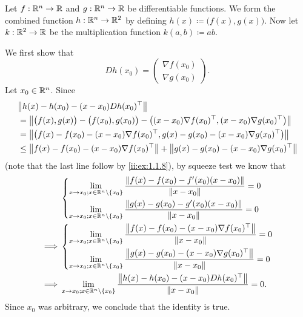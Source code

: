 \begin{eg}\label{ii:6.4.2}
  Let \(f : \R^n \to \R\) and \(g : \R^n \to \R\) be differentiable functions.
  We form the combined function \(h : \R^n \to \R^2\) by defining \(h(x) \coloneqq \big(f(x), g(x)\big)\).
  Now let \(k : \R^2 \to \R\) be the multiplication function \(k(a, b) \coloneqq ab\).

  We first show that
  \[
    D h(x_0) = \begin{pmatrix}
      \nabla f(x_0) \\
      \nabla g(x_0)
    \end{pmatrix}.
  \]
  Let \(x_0 \in \R^n\).
  Since
  \begin{align*}
     & \norm*{h(x) - h(x_0) - (x - x_0) D h(x_0)^\top}                                                                                  \\
     & = \norm*{\big(f(x), g(x)\big) - \big(f(x_0), g(x_0)\big) - \big((x - x_0) \nabla f(x_0)^\top, (x - x_0) \nabla g(x_0)^\top\big)} \\
     & = \norm*{\big(f(x) - f(x_0) - (x - x_0) \nabla f(x_0)^\top, g(x) - g(x_0) - (x - x_0) \nabla g(x_0)^\top\big)}                   \\
     & \leq \norm*{f(x) - f(x_0) - (x - x_0) \nabla f(x_0)^\top} + \norm*{g(x) - g(x_0) - (x - x_0) \nabla g(x_0)^\top}
  \end{align*}
  (note that the last line follow by \cref{ii:ex:1.1.8}),
  by squeeze test we know that
  \begin{align*}
             & \begin{dcases}
                 \lim_{x \to x_0 ; x \in \R^n \setminus \set{x_0}} \dfrac{\norm*{f(x) - f(x_0) - f'(x_0)(x - x_0)}}{\norm*{x - x_0}} = 0 \\
                 \lim_{x \to x_0 ; x \in \R^n \setminus \set{x_0}} \dfrac{\norm*{g(x) - g(x_0) - g'(x_0)(x - x_0)}}{\norm*{x - x_0}} = 0
               \end{dcases}       \\
    \implies & \begin{dcases}
                 \lim_{x \to x_0 ; x \in \R^n \setminus \set{x_0}} \dfrac{\norm*{f(x) - f(x_0) - (x - x_0) \nabla f(x_0)^\top}}{\norm*{x - x_0}} = 0 \\
                 \lim_{x \to x_0 ; x \in \R^n \setminus \set{x_0}} \dfrac{\norm*{g(x) - g(x_0) - (x - x_0) \nabla g(x_0)^\top}}{\norm*{x - x_0}} = 0
               \end{dcases}       \\
    \implies & \lim_{x \to x_0 ; x \in \R^n \setminus \set{x_0}} \dfrac{\norm*{h(x) - h(x_0) - (x - x_0) D h(x_0)^\top}}{\norm*{x - x_0}} = 0.
  \end{align*}
  Since \(x_0\) was arbitrary, we conclude that the identity is true.


\end{eg}
